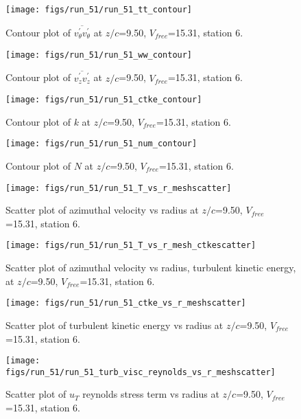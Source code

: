 \begin{figure}[H]
\centering
\texttt{[image: figs/run\_51/run\_51\_tt\_contour]}
\caption{Contour plot of $\overline{v_{\theta}^{\prime} v_{\theta}^{\prime}}$ at $z/c$=9.50, $V_{free}$=15.31, station 6.}
\end{figure}


\begin{figure}[H]
\centering
\texttt{[image: figs/run\_51/run\_51\_ww\_contour]}
\caption{Contour plot of $\overline{v_{z}^{\prime} v_{z}^{\prime}}$ at $z/c$=9.50, $V_{free}$=15.31, station 6.}
\end{figure}


\begin{figure}[H]
\centering
\texttt{[image: figs/run\_51/run\_51\_ctke\_contour]}
\caption{Contour plot of $k$ at $z/c$=9.50, $V_{free}$=15.31, station 6.}
\end{figure}


\begin{figure}[H]
\centering
\texttt{[image: figs/run\_51/run\_51\_num\_contour]}
\caption{Contour plot of $N$ at $z/c$=9.50, $V_{free}$=15.31, station 6.}
\end{figure}


\begin{figure}[H]
\centering
\texttt{[image: figs/run\_51/run\_51\_T\_vs\_r\_meshscatter]}
\caption{Scatter plot of azimuthal velocity vs radius at $z/c$=9.50, $V_{free}$=15.31, station 6.}
\end{figure}


\begin{figure}[H]
\centering
\texttt{[image: figs/run\_51/run\_51\_T\_vs\_r\_mesh\_ctkescatter]}
\caption{Scatter plot of azimuthal velocity vs radius, turbulent kinetic energy, at $z/c$=9.50, $V_{free}$=15.31, station 6.}
\end{figure}


\begin{figure}[H]
\centering
\texttt{[image: figs/run\_51/run\_51\_ctke\_vs\_r\_meshscatter]}
\caption{Scatter plot of turbulent kinetic energy vs radius at $z/c$=9.50, $V_{free}$=15.31, station 6.}
\end{figure}


\begin{figure}[H]
\centering
\texttt{[image: figs/run\_51/run\_51\_turb\_visc\_reynolds\_vs\_r\_meshscatter]}
\caption{Scatter plot of $
u_T$ reynolds stress term vs radius at $z/c$=9.50, $V_{free}$=15.31, station 6.}
\end{figure}


